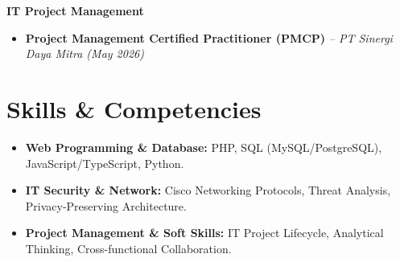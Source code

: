 \documentclass[a4paper,11pt]{article}
\begin{document}
\vspace{0.2em}

\noindent \textbf{\faTasks \hspace{0.2em} IT Project Management}
\begin{itemize}[leftmargin=1.5em, itemsep=0.2em]
    \item \textbf{Project Management Certified Practitioner (PMCP)} \textit{-- PT Sinergi Daya Mitra (May 2026)}
\end{itemize}

\vspace{0.4em}

\section*{Skills \& Competencies}
\begin{itemize}[leftmargin=1.5em, itemsep=0.35em]
    \item \textbf{Web Programming \& Database:} PHP, SQL (MySQL/PostgreSQL), JavaScript/TypeScript, Python.
    \item \textbf{IT Security \& Network:} Cisco Networking Protocols, Threat Analysis, Privacy-Preserving Architecture.
    \item \textbf{Project Management \& Soft Skills:} IT Project Lifecycle, Analytical Thinking, Cross-functional Collaboration.
\end{itemize}
\end{document}

